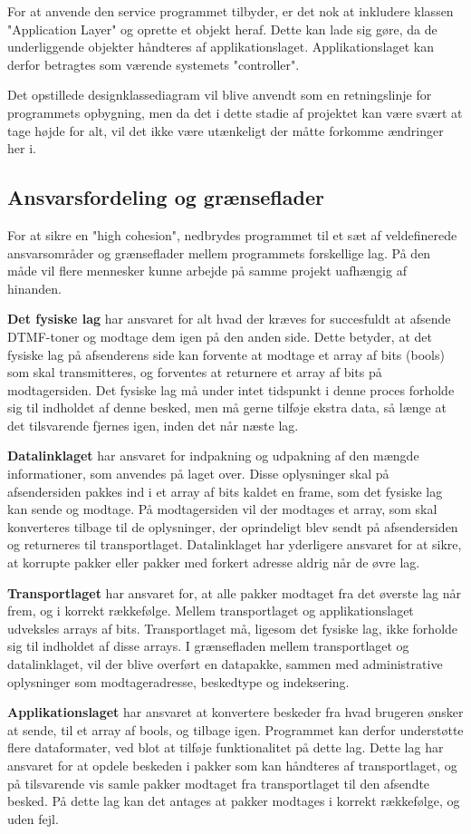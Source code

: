 For at anvende den service programmet tilbyder, er det nok at inkludere klassen "Application Layer" og oprette et objekt heraf. Dette kan lade sig gøre, da de underliggende objekter håndteres af applikationslaget. Applikationslaget kan derfor betragtes som værende systemets "controller".

Det opstillede designklassediagram vil blive anvendt som en retningslinje for programmets opbygning, men da det i dette stadie af projektet kan være svært at tage højde for alt, vil det ikke være utænkeligt der måtte forkomme ændringer her i.


\subsection{Ansvarsfordeling og grænseflader}
For at sikre en "high cohesion", nedbrydes programmet til et sæt af veldefinerede ansvarsområder og grænseflader mellem programmets forskellige lag. På den måde vil flere mennesker kunne arbejde på samme projekt uafhængig af hinanden.  

\textbf{Det fysiske lag} har ansvaret for alt hvad der kræves for succesfuldt at afsende DTMF-toner og modtage dem igen på den anden side. Dette betyder, at det fysiske lag på afsenderens side kan forvente at modtage et array af bits (bools) som skal transmitteres, og forventes at returnere et array af bits på modtagersiden. Det fysiske lag må under intet tidspunkt i denne proces forholde sig til indholdet af denne besked, men må gerne tilføje ekstra data, så længe at det tilsvarende fjernes igen, inden det når næste lag.

\textbf{Datalinklaget} har ansvaret for indpakning og udpakning af den mængde informationer, som anvendes på laget over. Disse oplysninger skal på afsendersiden pakkes ind i et array af bits kaldet en frame, som det fysiske lag kan sende og modtage. På modtagersiden vil der modtages et array, som skal  konverteres tilbage til de oplysninger, der oprindeligt blev sendt på afsendersiden og returneres til transportlaget. 
Datalinklaget har yderligere ansvaret for at sikre, at korrupte pakker eller pakker med forkert adresse aldrig når de øvre lag.

\textbf{Transportlaget} har ansvaret for, at alle pakker modtaget fra det øverste lag når frem, og i korrekt rækkefølge. Mellem transportlaget og applikationslaget udveksles arrays af bits. Transportlaget må, ligesom det fysiske lag, ikke forholde sig til indholdet af disse arrays. I grænsefladen mellem transportlaget og datalinklaget, vil der blive overført en datapakke, sammen med administrative oplysninger som modtageradresse, beskedtype og indeksering. 

\textbf{Applikationslaget} har ansvaret at konvertere beskeder fra hvad brugeren ønsker at sende, til et array af bools, og tilbage igen. Programmet kan derfor understøtte flere dataformater, ved blot at tilføje funktionalitet på dette lag. 
Dette lag har ansvaret for at opdele beskeden i pakker som kan håndteres af transportlaget, og på tilsvarende vis samle pakker modtaget fra transportlaget til den afsendte besked. På dette lag kan det antages at pakker modtages i korrekt rækkefølge, og uden fejl. 